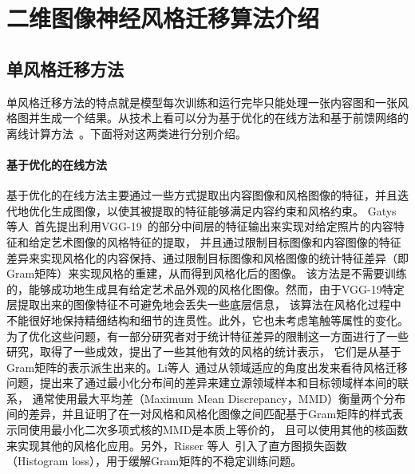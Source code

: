 \section{二维图像神经风格迁移算法介绍}
\subsection{单风格迁移方法}
单风格迁移方法的特点就是模型每次训练和运行完毕只能处理一张内容图和一张风格图并生成一个结果。从技术上看可以分为基于优化的在线方法和基于前馈网络的离线计算方法~\cite{jing2019neural}。下面将对这两类进行分别介绍。

\paragraph{基于优化的在线方法}
基于优化的在线方法主要通过一些方式提取出内容图像和风格图像的特征，并且迭代地优化生成图像，以使其被提取的特征能够满足内容约束和风格约束。
Gatys 等人~\cite{gatys2016image,gatys2017controlling}首先提出利用VGG-19~\cite{simonyan2014very}的部分中间层的特征输出来实现对给定照片的内容特征和给定艺术图像的风格特征的提取，
并且通过限制目标图像和内容图像的特征差异来实现风格化的内容保持、通过限制目标图像和风格图像的统计特征差异（即Gram矩阵）来实现风格的重建，从而得到风格化后的图像。
该方法是不需要训练的，能够成功地生成具有给定艺术品外观的风格化图像。然而，由于VGG-19特定层提取出来的图像特征不可避免地会丢失一些底层信息，
该算法在风格化过程中不能很好地保持精细结构和细节的连贯性。此外，它也未考虑笔触等属性的变化。
为了优化这些问题，有一部分研究者对于统计特征差异的限制这一方面进行了一些研究，取得了一些成效，提出了一些其他有效的风格的统计表示，
它们是从基于Gram矩阵的表示派生出来的。Li等人~\cite{li2017demystifying}通过从领域适应的角度出发来看待风格迁移问题，提出来了通过最小化分布间的差异来建立源领域样本和目标领域样本间的联系，
通常使用最大平均差（Maximum Mean Discrepancy，MMD）衡量两个分布间的差异，并且证明了在一对风格和风格化图像之间匹配基于Gram矩阵的样式表示同使用最小化二次多项式核的MMD是本质上等价的，
且可以使用其他的核函数来实现其他的风格化应用。另外，Risser 等人~\cite{risser2017stable}引入了直方图损失函数（Histogram loss），用于缓解Gram矩阵的不稳定训练问题。

